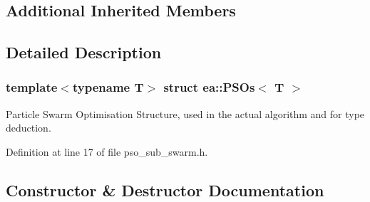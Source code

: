 \subsection*{Additional Inherited Members}


\subsection{Detailed Description}
\subsubsection*{template$<$typename T$>$\newline
struct ea\+::\+P\+S\+Os$<$ T $>$}

Particle Swarm Optimisation Structure, used in the actual algorithm and for type deduction. 

Definition at line 17 of file pso\+\_\+sub\+\_\+swarm.\+h.



\subsection{Constructor \& Destructor Documentation}
\mbox{\label{structea_1_1_p_s_os_ae9c6e48cd827aadb4463101211baaa16}} 
